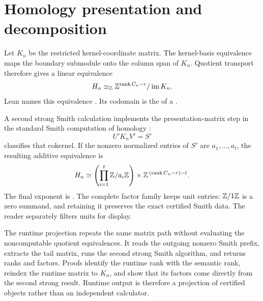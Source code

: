 \section{Homology presentation and decomposition}

Let $K_n$ be the restricted kernel-coordinate matrix.  The kernel-basis
equivalence maps the boundary submodule onto the column span of $K_n$.
Quotient transport therefore gives a linear equivalence
\[
  H_n
  \simeq_{\mathbb{Z}}
  \mathbb{Z}^{\operatorname{rank} C_n-r}/\operatorname{im}K_n.
\]
Lean names this equivalence .  Its codomain
is the  of a
.

A second strong Smith calculation implements the presentation-matrix step in
the standard Smith computation of homology
\citep[Chapter 3]{kaczynskiMischaikowMrozek2004}:
\[
  U'K_nV'=S'
\]
classifies that cokernel.  If the nonzero normalized entries of $S'$ are
$a_1,\ldots,a_t$, the resulting additive equivalence is
\[
  H_n \simeq
  \left(\prod_{i=1}^{t}\mathbb{Z}/a_i\mathbb{Z}\right)
  \times \mathbb{Z}^{\,(\operatorname{rank} C_n-r)-t}.
\]
The final exponent is .  The complete factor family keeps
unit entries: $\mathbb{Z}/1\mathbb{Z}$ is a zero summand, and retaining it preserves the
exact certified Smith data.  The reader
 separately filters units for display.

The runtime projection repeats the same matrix path without evaluating the
noncomputable quotient equivalences.  It reads the outgoing nonzero Smith
prefix, extracts the tail matrix, runs the second strong Smith algorithm, and
returns ranks and factors.  Proofs identify the runtime rank with the
semantic rank, reindex the runtime matrix to $K_n$, and show that its factors
come directly from the second strong result.  Runtime output is therefore a
projection of certified objects rather than an independent calculator.

